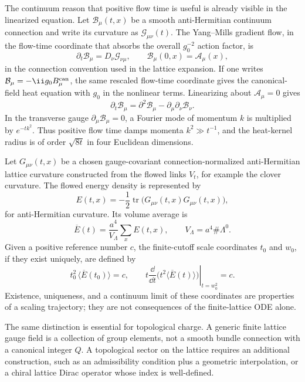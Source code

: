 The continuum reason that positive flow time is useful is already visible in
the linearized equation.  Let \(\mathcal B_\mu(t,x)\) be a smooth
anti-Hermitian continuum connection and write its curvature as
\(\mathcal G_{\mu\nu}(t)\).  The Yang--Mills gradient flow, in the flow-time
coordinate that absorbs the overall \(g_0^{-2}\) action factor, is
\begin{equation}
  \partial_t\mathcal B_\mu=D_\nu\mathcal G_{\nu\mu},
  \qquad
  \mathcal B_\mu(0,x)=\mathcal A_\mu(x),
  \label{eq:continuum-gradient-flow}
\end{equation}
in the connection convention used in the lattice expansion.  If one writes
\(\mathcal B_\mu=-\ii g_0B_\mu^{\rm can}\), the same rescaled flow-time
coordinate gives the canonical-field heat equation with \(g_0\) in the
nonlinear terms.  Linearizing about \(\mathcal A_\mu=0\) gives
\[
  \partial_t\mathcal B_\mu
  =
  \partial^2\mathcal B_\mu-\partial_\mu\partial_\nu\mathcal B_\nu .
\]
In the transverse gauge \(\partial_\mu\mathcal B_\mu=0\), a Fourier mode of
momentum \(k\) is multiplied by \(e^{-tk^2}\).  Thus positive flow time damps
momenta \(k^2\gg t^{-1}\), and the heat-kernel radius is of order
\(\sqrt{8t}\) in four Euclidean dimensions.

\begin{definition}
\label{def:lattice-flowed-energy-scale}
Let \(G_{\mu\nu}(t,x)\) be a chosen gauge-covariant connection-normalized
anti-Hermitian lattice curvature constructed from the flowed links \(V_t\), for
example the clover curvature.  The flowed energy density is represented by
\[
  E(t,x)=-\frac12\operatorname{tr}\bigl(G_{\mu\nu}(t,x)G_{\mu\nu}(t,x)\bigr),
\]
for anti-Hermitian curvature.  Its volume average is
\[
  \overline E(t)=\frac{a^4}{V_\Lambda}\sum_x E(t,x),
  \qquad
  V_\Lambda=a^4\#\Lambda^0 .
\]
Given a positive reference number \(c\), the finite-cutoff scale coordinates
\(t_0\) and \(w_0\), if they exist uniquely, are defined by
\[
  t_0^2\,\langle\overline E(t_0)\rangle=c,
  \qquad
  \left.
  t\frac{\dd}{\dd t}\bigl(t^2\langle\overline E(t)\rangle\bigr)
  \right|_{t=w_0^2}=c .
\]
Existence, uniqueness, and a continuum limit of these coordinates are
properties of a scaling trajectory; they are not consequences of the
finite-lattice ODE alone.
\end{definition}

The same distinction is essential for topological charge.  A generic finite
lattice gauge field is a collection of group elements, not a smooth bundle
connection with a canonical integer \(Q\).  A topological sector on the lattice
requires an additional construction, such as an admissibility condition plus a
geometric interpolation, or a chiral lattice Dirac operator whose index is
well-defined.


